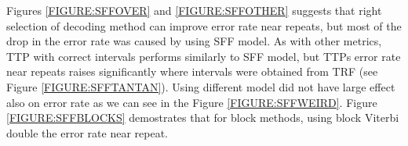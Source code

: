 Figures \ref{FIGURE:SFFOVER} and \ref{FIGURE:SFFOTHER} suggests that right
selection of decoding method can improve error rate near repeats, but most of
the drop in the error rate was caused by using SFF model. As with other
metrics, TTP with correct intervals performs similarly to SFF model, but TTPs
error rate near repeats raises significantly where intervals were obtained from
TRF (see Figure \ref{FIGURE:SFFTANTAN}). Using different  model did not have
large effect also on error rate as we can see in the Figure
\ref{FIGURE:SFFWEIRD}. Figure \ref{FIGURE:SFFBLOCKS} demostrates that for block
methods, using block Viterbi double the error rate near repeat.

\label{LastPage}
